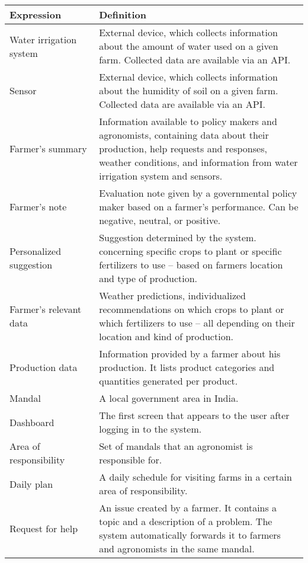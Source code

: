 \begin{center}
	\begin{tabular}{@{}p{0.30\linewidth} p{0.70\linewidth}@{}}
		\toprule
		\textbf{Expression}     & \textbf{Definition}\\
		\midrule
		Water irrigation system & External device, which collects information about the amount of water used on a given farm. Collected data are available via an API. \\
        Sensor                  & External device, which collects information about the humidity of soil on a given farm. Collected data are available via an API.\\
        Farmer's summary        & Information available to policy makers and agronomists, containing data about their production, help requests and responses, weather conditions, and information from water irrigation system and sensors.\\
        Farmer's note           & Evaluation note given by a governmental policy maker based on a farmer's performance. Can be negative, neutral, or positive.\\
        Personalized suggestion & Suggestion determined by the system. concerning specific crops to plant or specific fertilizers to use – based on farmers location and type of production.\\
        Farmer's relevant data  & Weather predictions, individualized recommendations on which crops to plant or which fertilizers to use – all depending on their location and kind of production.\\
        Production data         & Information provided by a farmer about his production. It lists product categories and quantities generated per product.\\
        Mandal                  & A local government area in India.\\
        Dashboard               & The first screen that appears to the user after logging in to the system.\\
        Area of responsibility  & Set of mandals that an agronomist is responsible for.\\
        Daily plan & A daily schedule for visiting farms in a certain area of responsibility.\\
        Request for help & An issue created by a farmer. It contains a topic and a description of a problem. The system automatically forwards it to farmers and agronomists in the same mandal.
	\end{tabular}
\end{center}

